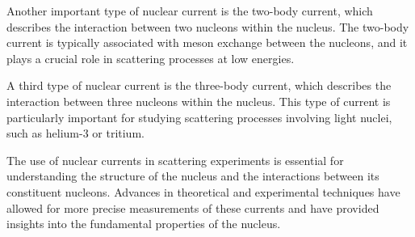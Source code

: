 Another important type of nuclear current is the two-body current, which describes the interaction between two nucleons within the nucleus. The two-body current is typically associated with meson exchange between the nucleons, and it plays a crucial role in scattering processes at low energies.

A third type of nuclear current is the three-body current, which describes the interaction between three nucleons within the nucleus. This type of current is particularly important for studying scattering processes involving light nuclei, such as helium-3 or tritium.

The use of nuclear currents in scattering experiments is essential for understanding the structure of the nucleus and the interactions between its constituent nucleons. Advances in theoretical and experimental techniques have allowed for more precise measurements of these currents and have provided insights into the fundamental properties of the nucleus.

